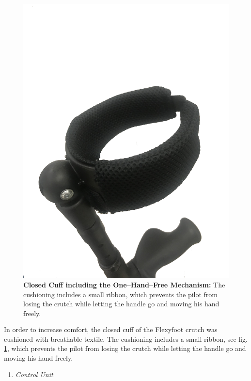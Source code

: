\documentclass[conference,a4paper]{IEEEtran}
\begin{document}
\begin{figure}[!t]
	\centering
	\includegraphics[width=0.75\columnwidth]{Images/Results/closed_cuff.png}
	\caption{\textbf{Closed Cuff including the One–Hand–Free Mechanism:} The cushioning includes a small ribbon, which prevents the pilot from losing the crutch while letting the handle go and moving his hand freely.}
	\label{closed cuff}
\end{figure}
In order to increase comfort, the closed cuff of the Flexyfoot crutch was cushioned with breathable textile. The cushioning includes a small ribbon, see fig. \ref{closed cuff}, which prevents the pilot from losing the crutch while letting the handle go and moving his hand freely.\\

\begin{enumerate}[\textit{(2)}]
    \item{\textit{Control Unit}}
\end{enumerate}
\end{document}
